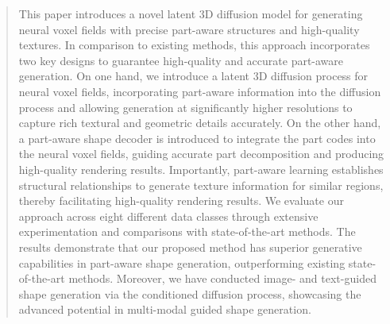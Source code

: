 \documentclass[lettersize,journal]{IEEEtran}
\begin{document}
\maketitle
\begin{abstract}
This paper introduces a novel latent 3D diffusion model for generating neural voxel fields with precise part-aware structures and high-quality textures. In comparison to existing methods, this approach incorporates two key designs to guarantee high-quality and accurate part-aware generation. On one hand, we introduce a latent 3D diffusion process for neural voxel fields, incorporating part-aware information into the diffusion process and allowing generation at significantly higher resolutions to capture rich textural and geometric details accurately. On the other hand, a part-aware shape decoder is introduced to integrate the part codes into the neural voxel fields, guiding accurate part decomposition and producing high-quality rendering results. Importantly, part-aware learning establishes structural relationships to generate texture information for similar regions, thereby facilitating high-quality rendering results. We evaluate our approach across eight different data classes through extensive experimentation and comparisons with state-of-the-art methods. The results demonstrate that our proposed method has superior generative capabilities in part-aware shape generation, outperforming existing state-of-the-art methods. Moreover, we have conducted image- and text-guided shape generation via the conditioned diffusion process, showcasing the advanced potential in multi-modal guided shape generation. %
\end{abstract}
\end{document}
